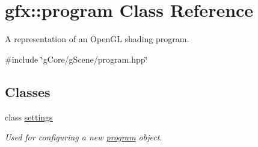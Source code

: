 \hypertarget{classgfx_1_1program}{\section{gfx\-:\-:program Class Reference}
\label{classgfx_1_1program}
}


A representation of an Open\-G\-L shading program.  




{\ttfamily \#include \char`\"{}g\-Core/g\-Scene/program.\-hpp\char`\"{}}

\subsection*{Classes}
\begin{DoxyCompactItemize}
\item 
class \hyperlink{classgfx_1_1program_1_1settings}{settings}
\begin{DoxyCompactList}\small\item\em Used for configuring a new \hyperlink{classgfx_1_1program}{program} object. \end{DoxyCompactList}\end{DoxyCompactItemize}
